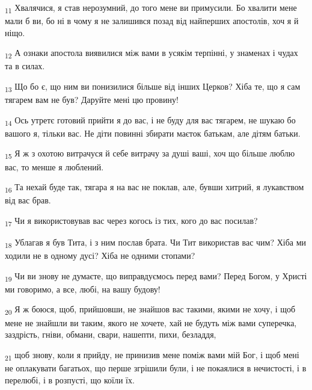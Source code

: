 \begin{tcolorbox}
\textsubscript{11} Хвалячися, я став нерозумний, до того мене ви примусили. Бо хвалити мене мали б ви, бо ні в чому я не залишився позад від найперших апостолів, хоч я й ніщо.
\end{tcolorbox}
\begin{tcolorbox}
\textsubscript{12} А ознаки апостола виявилися між вами в усякім терпінні, у знаменах і чудах та в силах.
\end{tcolorbox}
\begin{tcolorbox}
\textsubscript{13} Що бо є, що ним ви понизилися більше від інших Церков? Хіба те, що я сам тягарем вам не був? Даруйте мені цю провину!
\end{tcolorbox}
\begin{tcolorbox}
\textsubscript{14} Ось утретє готовий прийти я до вас, і не буду для вас тягарем, не шукаю бо вашого я, тільки вас. Не діти повинні збирати маєток батькам, але дітям батьки.
\end{tcolorbox}
\begin{tcolorbox}
\textsubscript{15} Я ж з охотою витрачуся й себе витрачу за душі ваші, хоч що більше люблю вас, то менше я люблений.
\end{tcolorbox}
\begin{tcolorbox}
\textsubscript{16} Та нехай буде так, тягара я на вас не поклав, але, бувши хитрий, я лукавством від вас брав.
\end{tcolorbox}
\begin{tcolorbox}
\textsubscript{17} Чи я використовував вас через когось із тих, кого до вас посилав?
\end{tcolorbox}
\begin{tcolorbox}
\textsubscript{18} Ублагав я був Тита, і з ним послав брата. Чи Тит використав вас чим? Хіба ми ходили не в одному дусі? Хіба не одними стопами?
\end{tcolorbox}
\begin{tcolorbox}
\textsubscript{19} Чи ви знову не думаєте, що виправдуємось перед вами? Перед Богом, у Христі ми говоримо, а все, любі, на вашу будову!
\end{tcolorbox}
\begin{tcolorbox}
\textsubscript{20} Я ж боюся, щоб, прийшовши, не знайшов вас такими, якими не хочу, і щоб мене не знайшли ви таким, якого не хочете, хай не будуть між вами суперечка, заздрість, гніви, обмани, свари, нашепти, пихи, безладдя,
\end{tcolorbox}
\begin{tcolorbox}
\textsubscript{21} щоб знову, коли я прийду, не принизив мене поміж вами мій Бог, і щоб мені не оплакувати багатьох, що перше згрішили були, і не покаялися в нечистості, і в перелюбі, і в розпусті, що коїли їх.
\end{tcolorbox}
